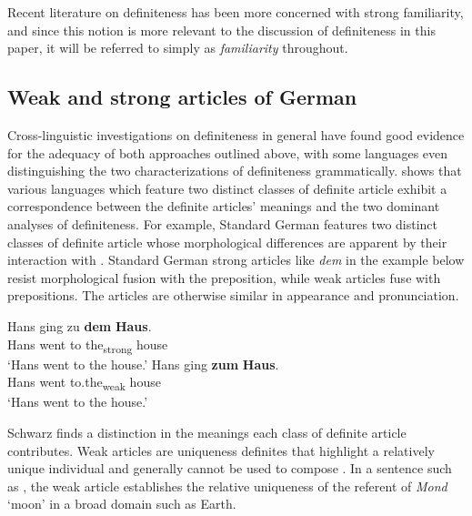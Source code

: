 \documentclass[output=paper,modfonts,nonflat]{langsci/langscibook}
\begin{document}
Recent literature on definiteness has been more concerned with strong familiarity, and since this notion is more relevant to the discussion of definiteness in this paper, it will be referred to simply as \textit{familiarity} throughout.

\subsection{Weak and strong articles of German} \label{sec:cisneros:2.2}\largerpage[2]

Cross-linguistic investigations on definiteness in general have found good evidence for the adequacy of both approaches outlined above, with some languages even distinguishing the two characterizations of definiteness grammatically.\linebreak \citet{Schwarz2009, Schwarz2013} shows that various  languages which feature two distinct classes of definite article exhibit a correspondence between the definite articles' meanings and the two dominant analyses of definiteness.  For example, Standard German features two distinct classes of definite article whose morphological differences are apparent by their interaction with .  Standard German strong articles like \textit{dem} in the example below resist morphological fusion with the preposition, while 
weak articles fuse with prepositions.  The articles are otherwise similar in appearance and pronunciation.

\ea \label{ex:cisneros:8}
\ea
\gll
Hans ging zu \textbf{dem} \textbf{Haus}.\\
Hans went to the\textsubscript{strong} house\\
\glt
`Hans went to the house.'
\ex
\gll
Hans ging \textbf{zum} \textbf{Haus}.\\
Hans went to.the\textsubscript{weak} house\\
\glt
`Hans went to the house.'
\z
\z

Schwarz finds a distinction in the meanings each class of definite article contributes.  Weak articles are uniqueness definites that highlight a relatively unique individual and generally cannot be used to compose .  In a sentence such as , the weak article establishes the relative uniqueness of the referent of \textit{Mond} `moon' in a broad domain such as Earth.
\end{document}
